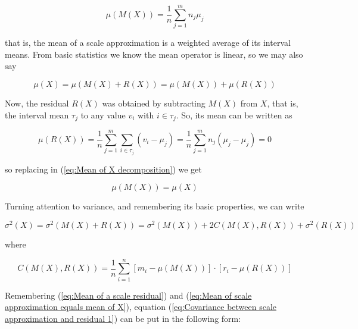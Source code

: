 \documentclass[a4paper,10pt]{book}
\begin{document}
\begin{equation}\label{eq:Mean of a scale approximation}
	\mu(M(X)) = \frac{1}{n} \sum_{j=1}^{m} n_{j} \mu_{j}
\end{equation}

\noindent that is, the mean of a scale approximation is a weighted average of its interval means. From basic statistics we know the mean operator is linear, so we may also say

\begin{equation}\label{eq:Mean of X decomposition}
	\mu(X) = \mu(M(X) + R(X)) = \mu(M(X)) + \mu(R(X))
\end{equation}

Now, the residual $R(X)$ was obtained by subtracting $M(X)$ from $X$, that is, the interval mean $\tau_{j}$ to any value $v_{i}$ with $i \in \tau_{j}$. So, its mean can be written as

\begin{equation}\label{eq:Mean of a scale residual}
	\mu(R(X)) = \frac{1}{n} \sum_{j=1}^{m} \sum_{i \in \tau_{j}} \left(v_{i} - \mu_{j}\right) =
	\frac{1}{n} \sum_{j=1}^{m} n_{j} \left(\mu_{j} - \mu_{j}\right) = 0
\end{equation}

\noindent so replacing in (\ref{eq:Mean of X decomposition}) we get

\begin{equation}\label{eq:Mean of scale approximation equals mean of X}
	\mu(M(X)) = \mu(X)
\end{equation}

\noindent Turning attention to variance, and remembering its basic properties, we can write

\begin{equation}\label{eq:Aux Var 1}
	\sigma^{2}(X) = \sigma^{2}(M(X) + R(X)) = \sigma^{2}(M(X)) + 2 C(M(X),R(X)) + \sigma^{2}(R(X))
\end{equation}

\noindent where

\begin{equation}\label{eq:Covariance between scale approximation and residual 1}
	C(M(X), R(X)) = \frac{1}{n} \sum_{i=1}^{n} \left[
		m_{i} - \mu(M(X))
	\right] \cdot \left[
		r_{i} - \mu(R(X))
	\right]
\end{equation}

\noindent Remembering (\ref{eq:Mean of a scale residual}) and (\ref{eq:Mean of scale approximation equals mean of X}), equation (\ref{eq:Covariance between scale approximation and residual 1}) can be put in the following form:
\end{document}
